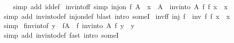 \begin{isabellebody}
%
\isadelimproof
\ \ %
\endisadelimproof
%
\isatagproof
{}\isamarkupfalse%
\ {\isacharparenleft}{\kern0pt}simp\ add{\isacharcolon}{\kern0pt}\ id{\isacharunderscore}{\kern0pt}def{\isacharparenright}{\kern0pt}%
\endisatagproof
{\isafoldproof}%
%
\isadelimproof
\isanewline
%
\endisadelimproof
\isanewline
{}\isamarkupfalse%
\ inv{\isacharunderscore}{\kern0pt}into{\isacharunderscore}{\kern0pt}f{\isacharunderscore}{\kern0pt}f\ {\isacharbrackleft}{\kern0pt}simp{\isacharbrackright}{\kern0pt}{\isacharcolon}{\kern0pt}\ {\isachardoublequoteopen}inj{\isacharunderscore}{\kern0pt}on\ f\ A\ {\isasymLongrightarrow}\ x\ {\isasymin}\ A\ {\isasymLongrightarrow}\ inv{\isacharunderscore}{\kern0pt}into\ A\ f\ {\isacharparenleft}{\kern0pt}f\ x{\isacharparenright}{\kern0pt}\ {\isacharequal}{\kern0pt}\ x{\isachardoublequoteclose}\isanewline
%
\isadelimproof
\ \ %
\endisadelimproof
%
\isatagproof
{}\isamarkupfalse%
\ {\isacharparenleft}{\kern0pt}simp\ add{\isacharcolon}{\kern0pt}\ inv{\isacharunderscore}{\kern0pt}into{\isacharunderscore}{\kern0pt}def\ inj{\isacharunderscore}{\kern0pt}on{\isacharunderscore}{\kern0pt}def{\isacharparenright}{\kern0pt}\ {\isacharparenleft}{\kern0pt}blast\ intro{\isacharcolon}{\kern0pt}\ someI{}{\isacharparenright}{\kern0pt}%
\endisatagproof
{\isafoldproof}%
%
\isadelimproof
\isanewline
%
\endisadelimproof
\isanewline
{}\isamarkupfalse%
\ inv{\isacharunderscore}{\kern0pt}f{\isacharunderscore}{\kern0pt}f{\isacharcolon}{\kern0pt}\ {\isachardoublequoteopen}inj\ f\ {\isasymLongrightarrow}\ inv\ f\ {\isacharparenleft}{\kern0pt}f\ x{\isacharparenright}{\kern0pt}\ {\isacharequal}{\kern0pt}\ x{\isachardoublequoteclose}\isanewline
%
\isadelimproof
\ \ %
\endisadelimproof
%
\isatagproof
{}\isamarkupfalse%
\ simp%
\endisatagproof
{\isafoldproof}%
%
\isadelimproof
\isanewline
%
\endisadelimproof
\isanewline
{}\isamarkupfalse%
\ f{\isacharunderscore}{\kern0pt}inv{\isacharunderscore}{\kern0pt}into{\isacharunderscore}{\kern0pt}f{\isacharcolon}{\kern0pt}\ {\isachardoublequoteopen}y\ {\isasymin}\ f{\isacharbackquote}{\kern0pt}A\ {\isasymLongrightarrow}\ f\ {\isacharparenleft}{\kern0pt}inv{\isacharunderscore}{\kern0pt}into\ A\ f\ y{\isacharparenright}{\kern0pt}\ {\isacharequal}{\kern0pt}\ y{\isachardoublequoteclose}\isanewline
%
\isadelimproof
\ \ %
\endisadelimproof
%
\isatagproof
{}\isamarkupfalse%
\ {\isacharparenleft}{\kern0pt}simp\ add{\isacharcolon}{\kern0pt}\ inv{\isacharunderscore}{\kern0pt}into{\isacharunderscore}{\kern0pt}def{\isacharparenright}{\kern0pt}\ {\isacharparenleft}{\kern0pt}fast\ intro{\isacharcolon}{\kern0pt}\ someI{}{\isacharparenright}{\kern0pt}%

\end{isabellebody}
